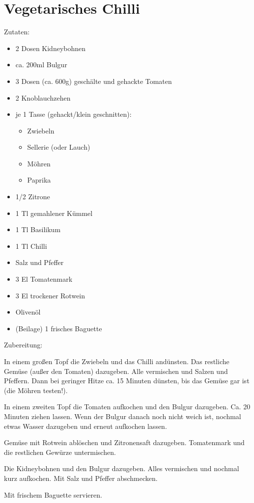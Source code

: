 \section{Vegetarisches Chilli}
Zutaten:
\begin{itemize}
    \item 2 Dosen Kidneybohnen
    \item ca. 200ml Bulgur
    \item 3 Dosen (ca. 600g) geschälte und gehackte Tomaten
    \item 2 Knoblauchzehen
    \item je 1 Tasse (gehackt/klein geschnitten):
        \begin{itemize}
            \item Zwiebeln
            \item Sellerie (oder Lauch)
            \item Möhren
            \item Paprika
        \end{itemize}
    \item 1/2 Zitrone
    \item 1 Tl gemahlener Kümmel
    \item 1 Tl Basilikum
    \item 1 Tl Chilli
    \item Salz und Pfeffer
    \item 3 El Tomatenmark
    \item 3 El trockener Rotwein
    \item Olivenöl
    \item (Beilage) 1 frisches Baguette
\end{itemize}

\noindent Zubereitung:

\noindent In einem großen Topf die Zwiebeln und das Chilli andünsten. Das
restliche Gemüse (außer den Tomaten) dazugeben. Alle vermischen und Salzen und
Pfeffern. Dann bei geringer Hitze ca. 15 Minuten dünsten, bis das Gemüse gar
ist (die Möhren testen!).

In einem zweiten Topf die Tomaten aufkochen und den Bulgur dazugeben. Ca. 20
Minuten ziehen lassen. Wenn der Bulgur danach noch nicht weich  ist, nochmal
etwas Wasser dazugeben und erneut aufkochen lassen.

Gemüse mit Rotwein ablöschen und Zitronensaft dazugeben. Tomatenmark und die
restlichen Gewürze untermischen.

Die Kidneybohnen und den Bulgur dazugeben. Alles vermischen und nochmal kurz
aufkochen. Mit Salz und Pfeffer abschmecken.

Mit frischem Baguette servieren.

\mbox{}
\vfill
\begin{center}
\end{center}
\vfill
\mbox{ }
\newpage
